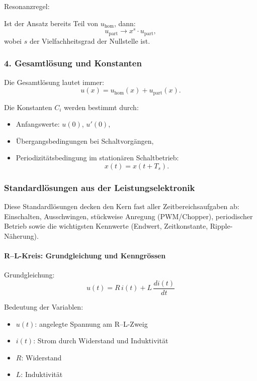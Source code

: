 Resonanzregel:

Ist der Ansatz bereits Teil von $u_{\mathrm{hom}}$, dann:
\[
u_{\mathrm{part}} \rightarrow x^s \cdot u_{\mathrm{part}},
\]
wobei $s$ der Vielfachheitsgrad der Nullstelle ist.


\subsubsection{4. Gesamtlösung und Konstanten}

Die Gesamtlösung lautet immer:
\[
u(x) = u_{\mathrm{hom}}(x) + u_{\mathrm{part}}(x).
\]

Die Konstanten $C_i$ werden bestimmt durch:
\begin{itemize}
    \item Anfangswerte: $u(0)$, $u'(0)$,
    \item Übergangsbedingungen bei Schaltvorgängen,
    \item Periodizitätsbedingung im stationären Schaltbetrieb:
    \[
    x(t) = x(t + T_s).
    \]
\end{itemize}

\subsubsection{Standardlösungen aus der Leistungselektronik}

Diese Standardlösungen decken den Kern fast aller Zeitbereichsaufgaben ab:
Einschalten, Ausschwingen, stückweise Anregung (PWM/Chopper), periodischer Betrieb sowie
die wichtigsten Kennwerte (Endwert, Zeitkonstante, Ripple-Näherung).


\paragraph{R--L-Kreis: Grundgleichung und Kenngrössen}

Grundgleichung:
\[
\boxed{
u(t)=R\,i(t)+L\,\frac{di(t)}{dt}
}
\]

Bedeutung der Variablen:
\begin{itemize}
\item $u(t)$: angelegte Spannung am R--L-Zweig
\item $i(t)$: Strom durch Widerstand und Induktivität
\item $R$: Widerstand
\item $L$: Induktivität
\end{itemize}


